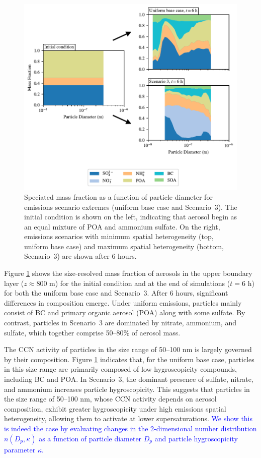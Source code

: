 \documentclass[journal abbreviation, manuscript]{copernicus}
\begin{document}
\begin{figure}[!h]
	\centering
	\includegraphics[]{figures/speciated-mass-frac-three-panel-z40.pdf}
	\caption{Speciated mass fraction as a function of particle
          diameter for emissions scenario extremes (uniform base case
          and Scenario~3). The initial condition is shown on the left,
          indicating that aerosol begin as an equal mixture of POA and
          ammonium sulfate. On the right, emissions scenarios with
          minimum spatial heterogeneity (top, uniform base case) and
          maximum spatial heterogeneity (bottom, Scenario~3) are shown
          after 6 hours.}
	\label{fig:speciated-mass-frac}
\end{figure} 

Figure \ref{fig:speciated-mass-frac} shows the size-resolved mass
fraction of aerosols in the upper boundary layer ($z\approx 800$ m)
for the initial condition and at the end of simulations ($t=6$ h) for
both the uniform base case and Scenario~3. After 6 hours, significant
differences in composition emerge. Under uniform emissions, particles
mainly consist of BC and primary organic aerosol (POA) along with some
sulfate. By contrast, particles in Scenario~3 are dominated by
nitrate, ammonium, and sulfate, which together comprise 50--80\% of
aerosol mass.

The CCN activity of particles in the size range of 50--100 nm is
largely governed by their composition. Figure
\ref{fig:speciated-mass-frac} indicates that, for the uniform base
case, particles in this size range are primarily composed of low
hygroscopicity compounds, including BC and POA. In Scenario~3, the
dominant presence of sulfate, nitrate, and ammonium increases particle
hygroscopicity.  This suggests that particles in the size range of
50--100 nm, whose CCN activity depends on aerosol composition, exhibit
greater hygroscopicity under high emissions spatial heterogeneity,
allowing them to activate at lower
supersaturations. \textcolor{blue}{We show this is indeed the case
by evaluating changes in the 2-dimensional number distribution 
$n(D_p, \kappa)$ as a function of particle diameter $D_p$ and particle
hygroscopicity parameter $\kappa$.}
\end{document}
